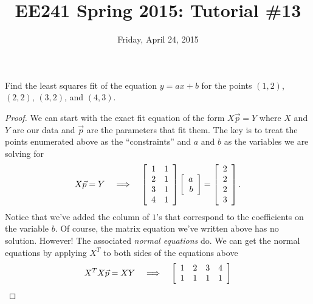 \documentclass{tutorial}
\begin{document}
\newif\ifsolns

\solnstrue

\title{EE241 Spring 2015: Tutorial \#13}
\date{Friday, April 24, 2015}
\maketitle



\begin{prob}
Find the least squares fit of the equation $y = ax+b$ for the points $(1,2)$, $(2,2)$, $(3,2)$, and $(4,3)$. 
\end{prob} \ifsolns \begin{proof}
We can start with the exact fit equation of the form $X\vec{p} = Y$ where $X$ and $Y$ are our data and $\vec{p}$ are the parameters that fit them. The key is to treat the points enumerated above as the ``constraints'' and $a$ and $b$ as the variables we are solving for
\[
  X \vec{p} = Y
  \hspace{0.15in} \Longrightarrow \hspace{0.15in}
  \left[ \begin{array}{rr}
    1 & 1 \\
    2 & 1 \\
    3 & 1 \\
    4 & 1
  \end{array} \right]
  \left[ \begin{array}{r} a \\ b \end{array} \right]
  = \left[ \begin{array}{r}
    2 \\ 2 \\ 2 \\ 3
  \end{array} \right] .
\]
Notice that we've added the column of $1$'s that correspond to the coefficients on the variable $b$. Of course, the matrix equation we've written above has no solution. However! The associated \emph{normal equations} do. We can get the normal equations by applying $X^T$ to both sides of the equations above
\[
  X^TX \vec{p} = XY
  \hspace{0.15in} \Longrightarrow \hspace{0.15in}
  \left[ \begin{array}{rrrr}
    1 & 2 & 3 & 4 \\
    1 & 1 & 1 & 1
  \end{array} \right]
\]
\end{proof}
\end{document}
